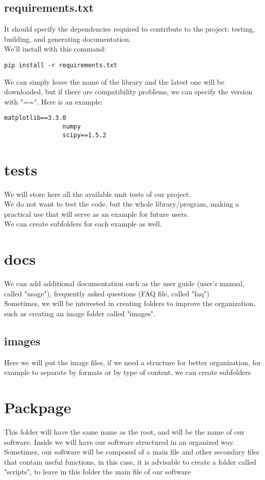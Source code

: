 \documentclass[a4paper]{article}
\begin{document}
		\subsection{requirements.txt}
			It should specify the dependencies required to contribute to the project: testing, building, and generating documentation.\\
			We'll install with this command:
			\begin{lstlisting}[caption=requirements.txt, label=lst:exampleRequeriments]
				pip install -r requirements.txt
			\end{lstlisting}
			We can simply leave the name of the library and the latest one will be downloaded, but if there are compatibility problems, we can specify the version with "==". Here is an example:\\
			\begin{lstlisting}[caption=requirements.txt, label=lst:exampleRequeriments]
				matplotlib==3.3.0
				numpy
				scipy==1.5.2
			\end{lstlisting} 
	\section{tests}
		We will store here all the available unit tests of our project.\\
		We do not want to test the code, but the whole library/program, making a practical use that will serve as an example for future users.\\
		We can create subfolders for each example as well.
	\section{docs}
		We can add additional documentation such as the user guide (user's manual, called "usage"), frequently asked questions (FAQ file, called "faq")\\
		Sometimes, we will be interested in creating folders to improve the organization, such as creating an image folder called "images".\\ 
		\subsection{images}
			Here we will put the image files, if we need a structure for better organization, for example to separate by formats or by type of content, we can create subfolders
	\section{Packpage}
		This folder will have the same name as the root, and will be the name of our software. Inside we will have our software structured in an organized way.\\
		Sometimes, our software will be composed of a main file and other secondary files that contain useful functions, in this case, it is advisable to create a folder called "scripts", to leave in this folder the main file of our software
\end{document}
